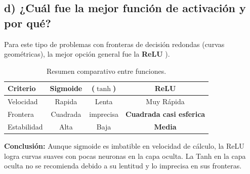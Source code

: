 \documentclass[12pt]{article}
\begin{document}
\subsection{d) ¿Cuál fue la mejor función de activación y por qué?}
Para este tipo de problemas con fronteras de decisión redondas (curvas geométricas), la mejor opción general fue la \textbf{ReLU }).

\begin{table}[H]
\centering
\begin{tabular}{|l|c|c|c|}
\hline
\textbf{Criterio} & \textbf{Sigmoide} & \textbf{($\tanh$)} & \textbf{ReLU} \\ \hline
Velocidad & Rapida & Lenta & Muy Rápida \\ \hline
Frontera & Cuadrada & imprecisa & \textbf{Cuadrada casi esferica} \\ \hline
Estabilidad & Alta & Baja & \textbf{Media} \\ \hline
\end{tabular}
\caption{Resumen comparativo entre funciones.}
\end{table}

\textbf{Conclusión:} Aunque $\text{sigmoide}$ es imbatible en velocidad de cálculo, la ReLU logra curvas suaves con pocas neuronas en la capa oculta. La Tanh en la capa oculta no se recomienda debido a su lentitud y lo imprecisa en sus fronteras.
\end{document}
